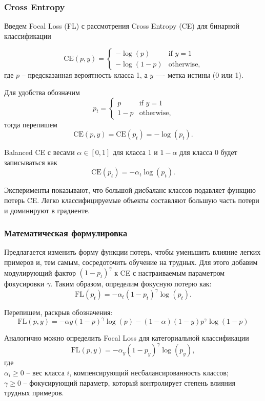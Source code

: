 \subsubsection*{Cross Entropy}

Введем Focal Loss (FL) с рассмотрения Cross Entropy (CE) для бинарной классификации

\[ 
    \text{CE}(p, y) = \begin{cases}
        -\log(p) & \text{if } y=1 \\
        -\log(1-p) & \text{otherwise,}
    \end{cases}
\] 
где $p$ -- предсказанная вероятность класса 1, а $y$ —- метка истины (0 или 1).

Для удобства обозначим
\[
    p_t = \begin{cases}
        p & \text{if } y=1 \\
        1-p & \text{otherwise,}
    \end{cases}
\]
тогда перепишем
\[
    \text{CE}(p, y) = \text{CE}(p_t) = -\log(p_t).
\]
 
Balanced CE с весами $\alpha\in[0,1]$ для класса 1 и $1-\alpha$ для класса 0 будет записываться как
\[
    \text{CE}(p_t) = -\alpha_t\log(p_t).
\]

Эксперименты показывают, что большой дисбаланс классов подавляет функцию потерь CE. Легко классифицируемые объекты составляют большую часть потери и доминируют в градиенте.

\subsubsection*{Математическая формулировка}

Предлагается изменить форму функции потерь, чтобы уменьшить влияние легких примеров и, тем самым, сосредоточить обучение на трудных. Для этого добавим модулирующий фактор $(1-p_t)^\gamma$ к CE с настраиваемым параметром фокусировки $\gamma$. Таким образом, определим фокусную потерю как:
\[
    \text{FL}(p_t)=-\alpha_t(1-p_t)^\gamma\log(p_t).
\]

Перепишем, раскрыв обозначения:
\[ 
    \text{FL}(p, y) = -\alpha y(1 - p)^{\gamma} \log(p) - (1 - \alpha)(1 - y) p^{\gamma} \log(1 - p) 
\] 

Аналогично можно определить Focal Loss для категориальной классификации
\[
    \text{FL}(p,y)=-\alpha_y (1-p_y)^\gamma\log(p_y),
\]
где
\\\indent $\alpha_i \ge 0$ -- вес класса $i$, компенсирующий несбалансированность классов;
\\\indent $\gamma \ge 0$ -- фокусирующий параметр, который контролирует степень влияния трудных примеров.

